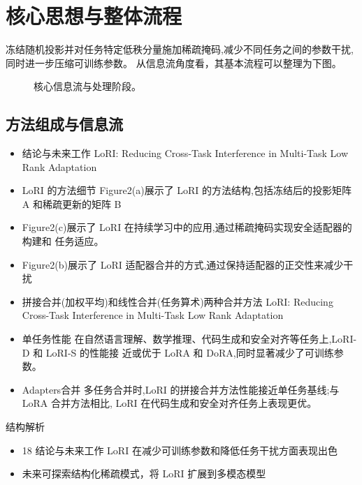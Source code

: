 \documentclass[UTF8,11pt,a4paper]{ctexart}
\begin{document}
\section{核心思想与整体流程}
冻结随机投影并对任务特定低秩分量施加稀疏掩码,减少不同任务之间的参数干扰,同时进一步压缩可训练参数。 从信息流角度看，其基本流程可以整理为下图。

\begin{figure}[H]
\centering
{}
\caption{核心信息流与处理阶段。}
\end{figure}

\subsection{方法组成与信息流}
\begin{itemize}
\item 结论与未来工作 LoRI: Reducing Cross-Task Interference in Multi-Task Low Rank Adaptation
\item LoRI 的方法细节 Figure2(a)展示了 LoRI 的方法结构,包括冻结后的投影矩阵 A 和稀疏更新的矩阵 B
\item Figure2(c)展示了 LoRI 在持续学习中的应用,通过稀疏掩码实现安全适配器的构建和 任务适应。
\item Figure2(b)展示了 LoRI 适配器合并的方式,通过保持适配器的正交性来减少干扰
\item 拼接合并(加权平均)和线性合并(任务算术)两种合并方法 LoRI: Reducing Cross-Task Interference in Multi-Task Low Rank Adaptation
\item 单任务性能 在自然语言理解、数学推理、代码生成和安全对齐等任务上,LoRI-D 和 LoRI-S 的性能接 近或优于 LoRA 和 DoRA,同时显著减少了可训练参数。
\item Adapters合并 多任务合并时,LoRI 的拼接合并方法性能接近单任务基线;与 LoRA 合并方法相比, LoRI 在代码生成和安全对齐任务上表现更优。
\end{itemize}

\begin{keybox}{结构解析}
\begin{itemize}
\item 18 结论与未来工作 LoRI 在减少可训练参数和降低任务干扰方面表现出色
\item 未来可探索结构化稀疏模式，将 LoRI 扩展到多模态模型
\end{itemize}
\end{keybox}
\end{document}

